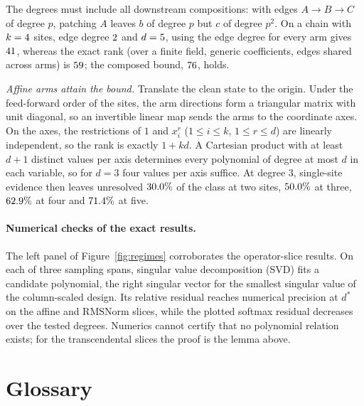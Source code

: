 The degrees must include all downstream compositions: with edges $A\to B\to C$ of degree $p$, patching $A$ leaves $b$ of degree
$p$ but $c$ of degree $p^2$. On a chain with $k=4$ sites, edge degree $2$ and $d=5$, using the edge degree
for every arm gives $41$, whereas the exact rank (over a finite field, generic coefficients, edges shared across
arms) is $59$; the composed bound, $76$, holds.

\emph{Affine arms attain the bound.} Translate the clean state to the origin. Under the feed-forward order of
the sites, the arm directions form a triangular matrix with unit diagonal, so an invertible linear map sends the
arms to the coordinate axes. On the axes, the restrictions of $1$ and $x_i^r$ ($1\le i\le k$, $1\le r\le d$) are
linearly independent, so the rank is exactly $1+kd$. A Cartesian product with at least $d+1$ distinct values per axis
determines every polynomial of degree at most $d$ in each variable, so for $d=3$ four values per axis suffice. At degree $3$, single-site evidence then leaves unresolved $30.0\%$ of the
class at two sites, $50.0\%$ at three, $62.9\%$ at four and $71.4\%$ at five.

\paragraph{Numerical checks of the exact results.} The left panel of Figure~\ref{fig:regimes} corroborates the
operator-slice results. On each of three sampling spans, singular value decomposition (SVD) fits a candidate
polynomial, the right singular vector for the smallest singular value of the column-scaled design. Its relative
residual reaches numerical precision at $d^*$ on the affine and RMSNorm slices, while the plotted softmax residual
decreases over the tested degrees. Numerics cannot certify that no polynomial relation exists; for the
transcendental slices the proof is the lemma above.

\section{Glossary}
\label{app:glossary}


